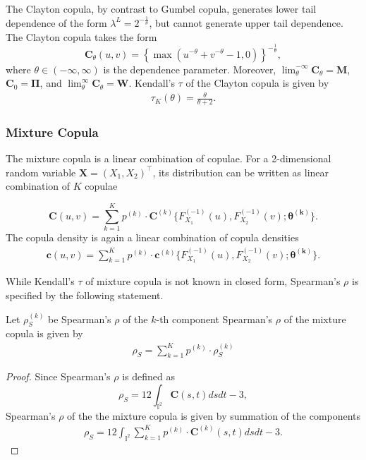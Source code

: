 The Clayton copula, by contrast to Gumbel copula,
generates lower tail dependence of the form $\lambda^L =
2^{-\frac{1}{\theta}}$, but cannot generate upper tail dependence.
The Clayton copula takes the form
\begin{equation*}
  \bm{C}_{\theta}(u,v) = \left\{
    \max(u^{-\theta}+v^{-\theta}-1,0)\right\}^{-\frac{1}{\theta}},
\end{equation*}
where $\theta \in (-\infty, \infty)$ is the dependence parameter.
Moreover, $\lim_\theta^{-\infty} \bm{C}_\theta = \bm{M}$, $\bm{C}_0 =
\bm{\Pi}$, and $\lim_\theta^\infty \bm{C}_\theta = \bm{W}$. 
Kendall's $\tau$ of the Clayton copula is given by 
\begin{align}
    \tau_K(\theta) =\frac{\theta}{\theta+2}.
    \end{align}

\subsubsection{Mixture Copula}\label{sec:mixture-copula}
The mixture copula is a linear combination of copulae. 
For a 2-dimensional random variable $\bm{X}=(X_1,X_2)^\top$,
its distribution can be written as linear combination of $K$ copulae

\begin{equation*} 
    \bm{C}(u,v)= \sum_{k=1}^K p^{(k)} \cdot \bm{C}^{(k)}\{F^{(-1)}_{X_1}(u),
    F^{(-1)}_{X_2}(v); \bm{\theta^{(k)}}\}.
    \end{equation*}
The copula density is again a linear combination of copula densities
\begin{align*}
    \bm{c}(u,v)= \sum_{k=1}^K p^{(k)} \cdot \bm{c}^{(k)}\{F^{(-1)}_{X_1}(u),
    F^{(-1)}_{X_2}(v); \bm{\theta^{(k)}}\}.
    \end{align*}

While Kendall's $\tau$ of mixture copula is not known in closed form,
Spearman's $\rho$ is specified by the following statement. 

\begin{proposition}
  Let $\rho_S^{(k)}$ be Spearman's $\rho$ of the $k$-th component
  Spearman's $\rho$ of the mixture copula is given by 
  \begin{align}
        \rho_S = \sum_{k=1}^K p^{(k)} \cdot \rho_S^{(k)}
        \end{align}
    \end{proposition}

\begin{proof}
    Since Spearman's $\rho$ is defined as \citep{Nelsen1999}
    \begin{equation*}
      \rho_S = 12 \int_{\mathbb{I}^2} \bm{C}(s,t) ds dt - 3,
    \end{equation*}
    Spearman's $\rho$ of the the mixture copula is given by summation
    of the components 
       \begin{align}
        \rho_S = 12 \int_{\mathbb{I}^2} \sum_{k=1}^K p^{(k)} \cdot
         \bm{C}^{(k)}(s,t) ds dt - 3. 
        \end{align}
    \end{proof}

